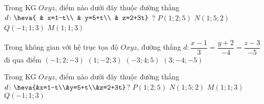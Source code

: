 \begin{ex}%
	Trong KG $Oxyz$, điểm nào dưới đây thuộc đường thẳng $d\colon\heva{
		& x=1-t\\ 
		& y=5+t\\ 
		& z=2+3t}$ ?
	\choice
	{$P\left(1;2;5\right)$}
	{\True $N\left(1;5;2\right)$}
	{$Q\left(-1;1;3\right)$}
	{$M\left(1;1;3\right)$}
\end{ex}

\begin{ex}%
	Trong không gian với hệ trục tọa độ $Oxyz$, đường thẳng $ d\colon \dfrac{x-1}{3}=\dfrac{y+2}{-4}=\dfrac{z-3}{-5}$ đi qua điểm
	\choice
	{$\left(-1;2;-3\right)$}
	{\True $\left(1;-2;3\right)$}
	{$\left(-3;4;5\right)$}
	{$\left(3;-4;-5\right)$}
	\loigiai{
	}
\end{ex}

\begin{ex}%
	Trong KG $Oxyz$, điểm nào dưới đây thuộc đường thẳng $d\colon \heva{&x=1-t\\&y=5+t\\&z=2+3t}$?
	\choice
	{$P(1;2;5)$}
	{\True $N(1;5;2)$ }
	{$M(1;1;3)$}
	{$Q(-1;1;3)$}
\end{ex}

